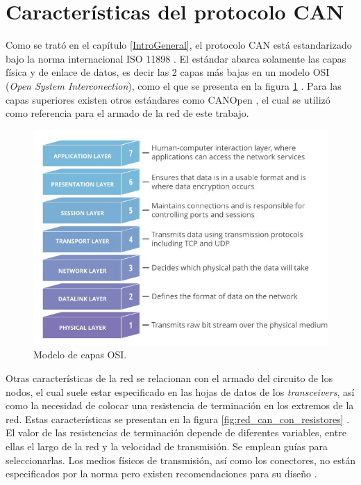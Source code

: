 \section{Características del protocolo CAN}
\label{caracteristicas_can}

Como se trató en el capítulo \ref{IntroGeneral}, el protocolo CAN está estandarizado bajo la norma internacional ISO 11898 \citep{web_ISO_CAN}. El estándar abarca solamente las capas física y de enlace de datos, es decir las 2 capas más bajas en un modelo OSI (\textit{Open System Interconection}), como el que se presenta en la figura \ref{fig:modeloOsi} \citep{web_modelo_osi}. Para las capas superiores existen otros estándares como CANOpen \citep{web_canopen}, el cual se utilizó como referencia para el armado de la red de este trabajo.

\begin{figure}[h!]
	\centering
	\includegraphics[scale=.7]{./Figures/OSI_model.JPG}
	\caption{Modelo de capas OSI\protect\footnotemark .}
	\label{fig:modeloOsi}
\end{figure}


Otras características de la red se relacionan con el armado del circuito de los nodos, el cual suele estar especificado en las hojas de datos de los \textit{transceivers}, así como la necesidad de colocar una resistencia de terminación en los extremos de la red. Estas características se presentan en la figura \ref{fig:red_can_con_resistores} \citep{web_can_bus_arduino}. El valor de las resistencias de terminación depende de diferentes variables, entre ellas el largo de la red y la velocidad de transmisión. Se emplean guías para seleccionarlas. Los medios físicos de transmisión, así como los conectores, no están especificados por la norma pero existen recomendaciones para su diseño \citep{Embedded_Networking_CAN}.

